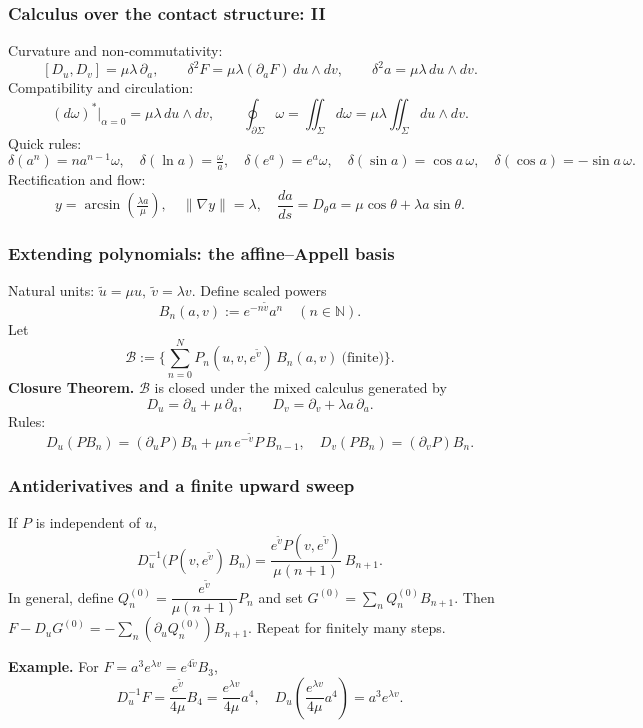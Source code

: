 \documentclass[aspectratio=169]{beamer}
\begin{document}
\begin{frame}
    \frametitle{Calculus over the contact structure: II}
    Curvature and non-commutativity:
    \[
      [D_u,D_v]=\mu\lambda\,\partial_a,\qquad
      \delta^2F=\mu\lambda(\partial_a F)\,du\wedge dv,\qquad
      \delta^2 a=\mu\lambda\,du\wedge dv.
    \]
    Compatibility and circulation:
    \[
      (d\omega)^*\big|_{\alpha=0}=\mu\lambda\,du\wedge dv,\qquad
      \oint_{\partial\Sigma}\omega=\iint_\Sigma d\omega=\mu\lambda\iint_\Sigma du\wedge dv.
    \]
    Quick rules:
    \[
      \delta(a^n)=n a^{n-1}\omega,\quad
      \delta(\ln a)=\tfrac{\omega}{a},\quad
      \delta(e^a)=e^a\omega,\quad
      \delta(\sin a)=\cos a\,\omega,\quad
      \delta(\cos a)=-\sin a\,\omega.
    \]
    Rectification and flow:
    \[
      y=\arcsin\!\left(\tfrac{\lambda a}{\mu}\right),\quad \|\nabla y\|=\lambda,\quad
      \frac{da}{ds}=D_\theta a=\mu\cos\theta+\lambda a\sin\theta.
    \]
\end{frame}

\begin{frame}
  \frametitle{Extending polynomials: the affine–Appell basis}
  Natural units: $\tilde u=\mu u,\ \tilde v=\lambda v$. Define scaled powers
  \[
    B_n(a,v):=e^{-n\tilde v}a^n\quad(n\in\mathbb{N}).
  \]
  Let
  \[
    \mathcal{B}:=\Big\{\sum_{n=0}^N P_n(u,v,e^{\tilde v})\,B_n(a,v)\ \text{(finite)}\Big\}.
  \]
  \textbf{Closure Theorem.} $\mathcal{B}$ is closed under the mixed calculus generated by
  \[
    D_u=\partial_u+\mu\,\partial_a,\qquad D_v=\partial_v+\lambda a\,\partial_a.
  \]
  Rules:
  \[
    D_u(PB_n)=(\partial_u P)B_n+\mu n\,e^{-\tilde v}P\,B_{n-1},\quad
    D_v(PB_n)=(\partial_v P)B_n.
  \]
\end{frame}

\begin{frame}
  \frametitle{Antiderivatives and a finite upward sweep}
  If $P$ is independent of $u$,
  \[
    D_u^{-1}\!\big(P(v,e^{\tilde v})\,B_n\big)=\frac{e^{\tilde v}P(v,e^{\tilde v})}{\mu(n+1)}\,B_{n+1}.
  \]
  In general, define $Q^{(0)}_n=\dfrac{e^{\tilde v}}{\mu(n+1)}P_n$ and set $G^{(0)}=\sum_n Q^{(0)}_nB_{n+1}$.
  Then $F-\!D_uG^{(0)}=-\sum_n(\partial_uQ^{(0)}_n)B_{n+1}$. Repeat for finitely many steps.
  \vspace{0.6em}

  \textbf{Example.} For $F=a^3e^{\lambda v}=e^{4\tilde v}B_3$,
  \[
    D_u^{-1}F=\frac{e^{\tilde v}}{4\mu}B_4=\frac{e^{\lambda v}}{4\mu}a^4,\quad
    D_u\!\left(\frac{e^{\lambda v}}{4\mu}a^4\right)=a^3e^{\lambda v}.
  \]
\end{frame}
\end{document}
